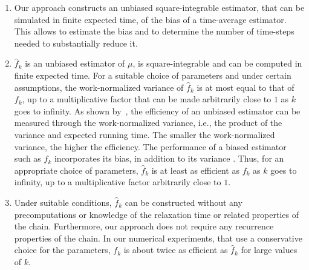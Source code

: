 \documentclass[a4paper,11pt]{article}
\begin{document}
\begin{enumerate}
\item Our approach constructs an unbiased square-integrable estimator, that can be simulated in finite expected time, of the bias of a time-average estimator. This  allows to estimate the bias and to determine the number of time-steps needed to substantially reduce it.
\item   \(\hat f_{k}\) is an unbiased estimator of \(\mu\), is square-integrable and can be computed in finite expected time. For a suitable choice of parameters and under certain assumptions, the work-normalized variance of   \(\hat f_{k}\) is at most equal to that of    \(f_{k}\), up to a multiplicative factor that can be made arbitrarily close to \(1\) as \(k\) goes to infinity. As shown by~\citet{glynn1992asymptotic}, the efficiency of an unbiased estimator can be measured through the work-normalized variance, i.e., the product of the variance and expected running time.     The smaller the work-normalized variance, the higher the efficiency. The performance of a biased estimator such as   \(f_{k}\)    incorporates its bias, in addition to its  variance \cite[p. 16]{glasserman2004Monte}. Thus, for an appropriate choice of parameters, \(\hat f_{k}\) is at least as efficient as  \(f_{k}\) as \(k\) goes to infinity, up to a multiplicative factor arbitrarily close to \(1\). 
\item Under suitable conditions, \(\hat f_{k}\) can be constructed without any precomputations or  knowledge of  the relaxation time or related properties of the chain.  Furthermore, our approach does not require any recurrence properties of the chain. In our numerical experiments, that use a conservative choice for the parameters,   \(f_{k}\) is about twice as efficient as    \(\hat f_{k}\) for large values of \(k\).
  
\end{enumerate}
\end{document}
